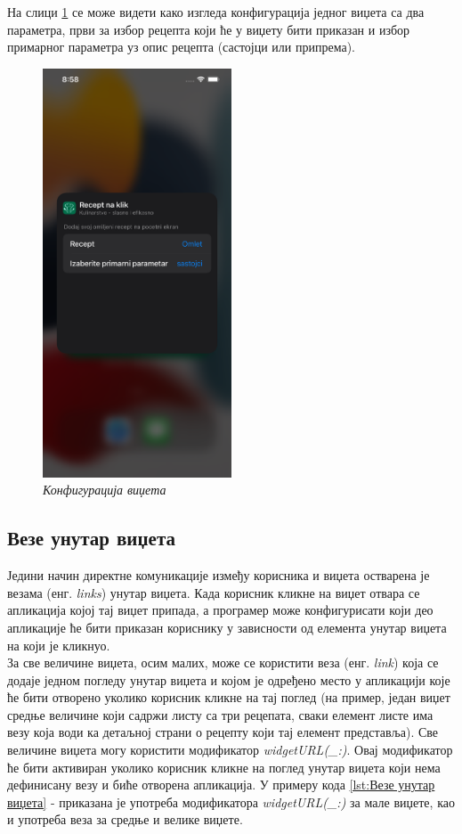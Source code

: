 \documentclass[12pt,oneside]{memoir}
\begin{document}
\indent На слици \ref{slika:widget_configuration} се може видети како изгледа конфигурација једног виџета са два параметра, први за избор рецепта који ће у виџету бити приказан и избор примарног параметра уз опис рецепта (састојци или припрема).

\begin{figure}[H]
\includegraphics[width=0.5\textwidth]{images/Widget_configuration.png}
\centering
\caption{\textit{Конфигурација виџета}}
\label{slika:widget_configuration}
\end{figure}

\subsection{Везе унутар виџета}
\indent Једини начин директне комуникације између корисника и виџета остварена је везама (енг. \textit{links}) унутар виџета. Када корисник кликне на виџет отвара се апликација којој тај виџет припада, а програмер може конфигурисати који део апликације ће бити приказан кориснику у зависности од елемента унутар виџета на који је кликнуо.
\\
\indent За све величине виџета, осим малих, може се користити веза (енг. \textit{link}) која се додаје једном погледу унутар виџета и којом је одређено место у апликацији које ће бити отворено уколико корисник кликне на тај поглед (на пример, један виџет средње величине који садржи листу са три рецепата, сваки елемент листе има везу која води ка детаљној страни о рецепту који тај елемент представља). Све величине виџета могу користити модификатор \textit{widgetURL(\_:)}. Овај модификатор ће бити активиран уколико корисник кликне на поглед унутар виџета који нема дефинисану везу и биће отворена апликација. У примеру кода \ref{lst:Везе унутар виџета} -  приказана је употреба модификатора \textit{widgetURL(\_:)} за мале виџете, као и употреба веза за средње и велике виџете.
\end{document}
